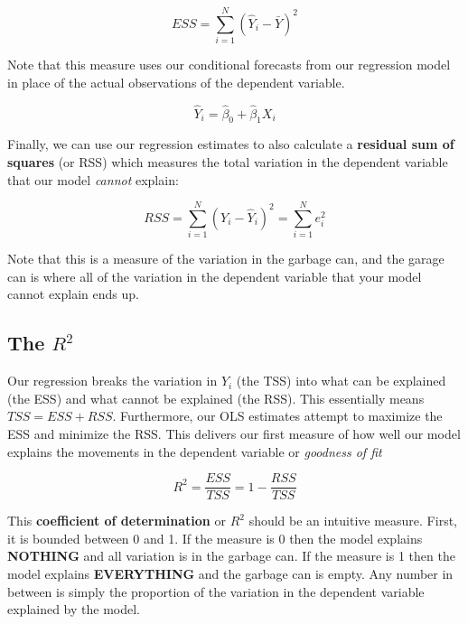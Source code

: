 \documentclass[
]{book}
\newenvironment{Shaded}{\begin{snugshade}}{\end{snugshade}}
\newcommand{\AttributeTok}[1]{\textcolor[rgb]{0.77,0.63,0.00}{#1}}
\newcommand{\FunctionTok}[1]{\textcolor[rgb]{0.00,0.00,0.00}{#1}}
\newcommand{\NormalTok}[1]{#1}
\newcommand{\OtherTok}[1]{\textcolor[rgb]{0.56,0.35,0.01}{#1}}
\newcommand{\SpecialCharTok}[1]{\textcolor[rgb]{0.00,0.00,0.00}{#1}}
\begin{document}
\[ESS = \sum^{N}_{i=1}(\hat{Y}_i - \bar{Y})^2\]

Note that this measure uses our conditional forecasts from our regression model in place of the actual observations of the dependent variable.

\[\hat{Y}_i = \hat{\beta}_0 + \hat{\beta}_1 X_i\]

Finally, we can use our regression estimates to also calculate a \textbf{residual sum of squares} (or RSS) which measures the total variation in the dependent variable that our model \emph{cannot} explain:

\[RSS = \sum^{N}_{i=1}(Y_i - \hat{Y}_i)^2 = \sum^{N}_{i=1}e_i^2\]

Note that this is a measure of the variation in the garbage can, and the garage can is where all of the variation in the dependent variable that your model cannot explain ends up.

\hypertarget{the-r2}{%
\subsection{\texorpdfstring{The \(R^2\)}{The R\^{}2}}\label{the-r2}}

Our regression breaks the variation in \(Y_i\) (the TSS) into what can be explained (the ESS) and what cannot be explained (the RSS). This essentially means \(TSS=ESS+RSS\). Furthermore, our OLS estimates attempt to maximize the ESS and minimize the RSS. This delivers our first measure of how well our model explains the movements in the dependent variable or \emph{goodness of fit}

\[R^2 = \frac{ESS}{TSS} = 1 - \frac{RSS}{TSS}\]

This \textbf{coefficient of determination} or \(R^2\) should be an intuitive measure. First, it is bounded between 0 and 1. If the measure is 0 then the model explains \textbf{NOTHING} and all variation is in the garbage can. If the measure is 1 then the model explains \textbf{EVERYTHING} and the garbage can is empty. Any number in between is simply the proportion of the variation in the dependent variable explained by the model.

\begin{Shaded}
\end{Shaded}
\end{document}
